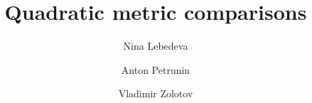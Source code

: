 \documentclass{article}
\begin{document}
\title{Quadratic metric comparisons}
\author{Nina Lebedeva}
\address{St. Petersburg State University, 7/9 Universitetskaya nab., St. Petersburg, 199034, Russia\\
St. Petersburg Department of V. A. Steklov Institute of Mathematics of the Russian Academy of Sciences, 27 Fontanka nab., St. Petersburg, 191023, Russia}
\author{Anton Petrunin}
\address{Math. Dept. PSU, University Park, PA 16802, USA.}
\author{Vladimir Zolotov}
\address{St. Petersburg State University, 7/9 Universitetskaya nab., St. Petersburg, 199034, Russia}

\date{}
\maketitle



\end{document}
